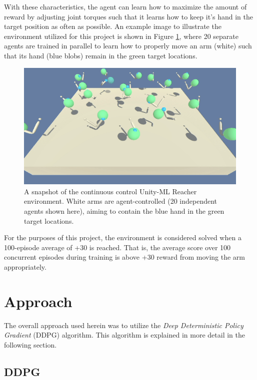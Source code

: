 \documentclass[11pt]{article}
\begin{document}
\FloatBarrier

With these characteristics, the agent can learn how to maximize the amount of reward by adjusting joint torques such that it learns how to keep it's hand in the target position as often as possible. An example image to illustrate the environment utilized for this project is shown in Figure \ref{fig:example-game-image}, where 20 separate agents are trained in parallel to learn how to properly move an arm (white) such that its hand (blue blobs) remain in the green target locations.

\begin{figure}[!ht]
	\centering
	\includegraphics[width=0.75\linewidth]{images/example-env-image.png}
	\caption{A snapshot of the continuous control Unity-ML Reacher environment. White arms are agent-controlled (20 independent agents shown here), aiming to contain the blue hand in the green target locations.}
	\label{fig:example-game-image}
\end{figure}

\FloatBarrier

For the purposes of this project, the environment is considered solved when a 100-episode average of +30 is reached. That is, the average score over 100 concurrent episodes during training is above +30 reward from moving the arm appropriately.

\section{Approach}

The overall approach used herein was to utilize the \textit{Deep Deterministic Policy Gradient} (DDPG) algorithm. This algorithm is explained in more detail in the following section.

\subsection{DDPG}
\end{document}
